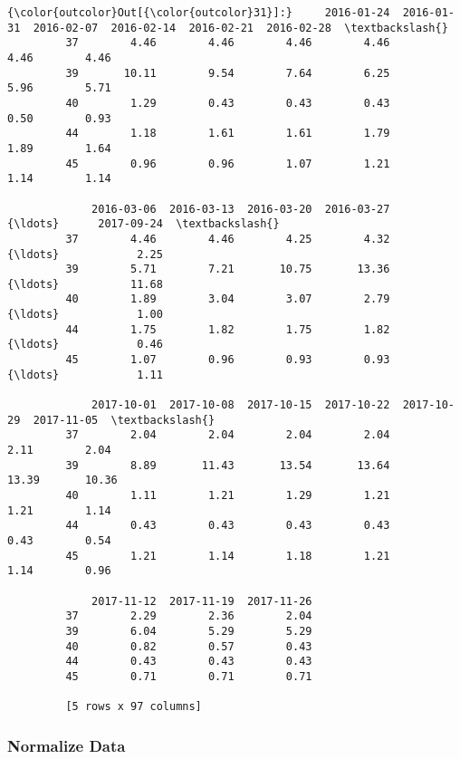 \documentclass[11pt]{article}
\begin{document}
\begin{Verbatim}[commandchars=\\\{\}]
{\color{outcolor}Out[{\color{outcolor}31}]:}     2016-01-24  2016-01-31  2016-02-07  2016-02-14  2016-02-21  2016-02-28  \textbackslash{}
         37        4.46        4.46        4.46        4.46        4.46        4.46   
         39       10.11        9.54        7.64        6.25        5.96        5.71   
         40        1.29        0.43        0.43        0.43        0.50        0.93   
         44        1.18        1.61        1.61        1.79        1.89        1.64   
         45        0.96        0.96        1.07        1.21        1.14        1.14   
         
             2016-03-06  2016-03-13  2016-03-20  2016-03-27     {\ldots}      2017-09-24  \textbackslash{}
         37        4.46        4.46        4.25        4.32     {\ldots}            2.25   
         39        5.71        7.21       10.75       13.36     {\ldots}           11.68   
         40        1.89        3.04        3.07        2.79     {\ldots}            1.00   
         44        1.75        1.82        1.75        1.82     {\ldots}            0.46   
         45        1.07        0.96        0.93        0.93     {\ldots}            1.11   
         
             2017-10-01  2017-10-08  2017-10-15  2017-10-22  2017-10-29  2017-11-05  \textbackslash{}
         37        2.04        2.04        2.04        2.04        2.11        2.04   
         39        8.89       11.43       13.54       13.64       13.39       10.36   
         40        1.11        1.21        1.29        1.21        1.21        1.14   
         44        0.43        0.43        0.43        0.43        0.43        0.54   
         45        1.21        1.14        1.18        1.21        1.14        0.96   
         
             2017-11-12  2017-11-19  2017-11-26  
         37        2.29        2.36        2.04  
         39        6.04        5.29        5.29  
         40        0.82        0.57        0.43  
         44        0.43        0.43        0.43  
         45        0.71        0.71        0.71  
         
         [5 rows x 97 columns]
\end{Verbatim}
            
    \subsubsection{Normalize Data}\label{normalize-data}
\end{document}
